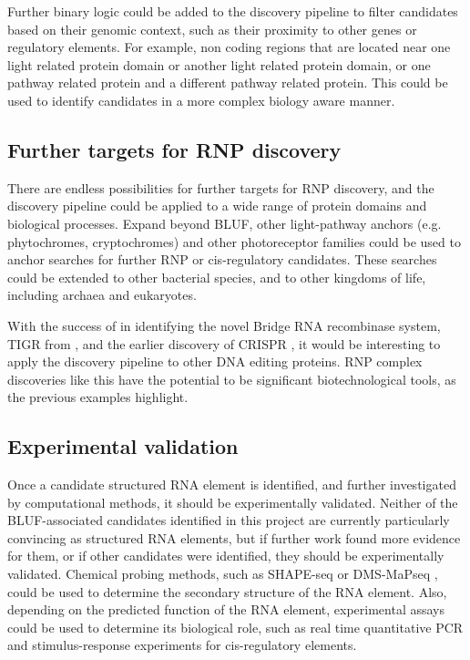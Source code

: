 Further binary logic could be added to the discovery pipeline to filter candidates based on their genomic context, such as their proximity to other genes or regulatory elements.
For example, non coding regions that are located near one light related protein domain or another light related protein domain, or one pathway related protein and a different pathway related protein.
This could be used to identify candidates in a more complex biology aware manner.

\subsection{Further targets for \ac{RNP} discovery}

There are endless possibilities for further targets for \ac{RNP} discovery, and the discovery pipeline could be applied to a wide range of protein domains and biological processes.
Expand beyond \ac{BLUF}, other light-pathway anchors (e.g. phytochromes, cryptochromes) and other photoreceptor families could be used to anchor searches for further \ac{RNP} or cis-regulatory candidates.
These searches could be extended to other bacterial species, and to other kingdoms of life, including archaea and eukaryotes.

With the success of \citet{Durrant2024} in identifying the novel Bridge RNA recombinase system, TIGR from \citet{Bruck2025}, and the earlier discovery of \ac{CRISPR} \citep{Barrangou2007}, it would be interesting to apply the discovery pipeline to other DNA editing proteins.
\ac{RNP} complex discoveries like this have the potential to be significant biotechnological tools, as the previous examples highlight.

\subsection{Experimental validation}

Once a candidate structured RNA element is identified, and further investigated by computational methods, it should be experimentally validated.
Neither of the \ac{BLUF}-associated candidates identified in this project are currently particularly convincing as structured RNA elements, but if further work found more evidence for them, or if other candidates were identified, they should be experimentally validated.
Chemical probing methods, such as \ac{SHAPE-seq} \citep{Lucks2011} or \ac{DMS-MaPseq} \citep{Zubradt2017}, could be used to determine the secondary structure of the RNA element.
Also, depending on the predicted function of the RNA element, experimental assays could be used to determine its biological role, such as real time quantitative \ac{PCR} and stimulus-response experiments for cis-regulatory elements.